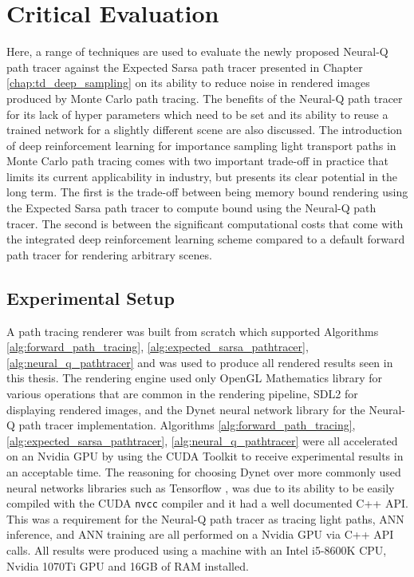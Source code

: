 \documentclass[../dissertation.tex]{subfiles}
\begin{document}
\chapter{Critical Evaluation}

\label{chap:evaluation}

Here, a range of techniques are used to evaluate the newly proposed Neural-Q path tracer against the Expected Sarsa path tracer presented in Chapter \ref{chap:td_deep_sampling} on its ability to reduce noise in rendered images produced by Monte Carlo path tracing. The benefits of the Neural-Q path tracer for its lack of hyper parameters which need to be set and its ability to reuse a trained network for a slightly different scene are also discussed. The introduction of deep reinforcement learning for importance sampling light transport paths in Monte Carlo path tracing comes with two important trade-off in practice that limits its current applicability in industry, but presents its clear potential in the long term. The first is the trade-off between being memory bound rendering using the Expected Sarsa path tracer to compute bound using the Neural-Q path tracer. The second is between the significant computational costs that come with the integrated deep reinforcement learning scheme compared to a default forward path tracer for rendering arbitrary scenes.

\section{Experimental Setup}

A path tracing renderer was built from scratch which supported Algorithms \ref{alg:forward_path_tracing}, \ref{alg:expected_sarsa_pathtracer}, \ref{alg:neural_q_pathtracer} and was used to produce all rendered results seen in this thesis. The rendering engine used only OpenGL Mathematics library \cite{glm} for various operations that are common in the rendering pipeline, SDL2 \cite{sdl2} for displaying rendered images, and the Dynet neural network library \cite{dynet} for the Neural-Q path tracer implementation. Algorithms \ref{alg:forward_path_tracing}, \ref{alg:expected_sarsa_pathtracer}, \ref{alg:neural_q_pathtracer} were all accelerated on an Nvidia GPU by using the CUDA Toolkit \cite{cuda} to receive experimental results in an acceptable time. The reasoning for choosing Dynet over more commonly used neural networks libraries such as Tensorflow \cite{tensorflow2015-whitepaper}, was due to its ability to be easily compiled with the CUDA \verb|nvcc| compiler and it had a well documented C++ API. This was a requirement for the Neural-Q path tracer as tracing light paths, ANN inference, and ANN training are all performed on a Nvidia GPU via C++ API calls. All results were produced using a machine with an Intel i5-8600K CPU, Nvidia 1070Ti GPU and 16GB of RAM installed.\\
\end{document}
